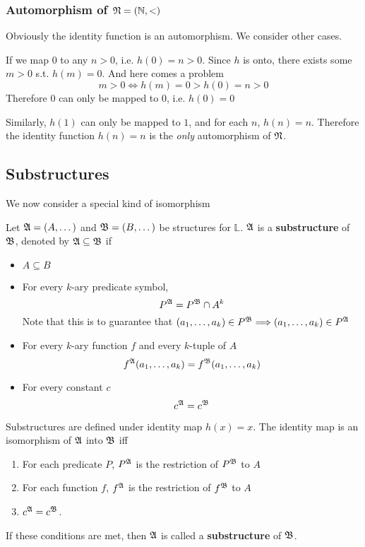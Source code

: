 \subsubsection{Automorphism of $\mathfrak{N} = (\mathbb{N}, <)$}

Obviously the identity function is an automorphism. We consider other cases.

If we map $0$ to any $n>0$, i.e. $h(0) = n > 0$. Since $h$ is onto, there exists some $m > 0$ s.t. $h(m) = 0$. And here comes a problem
\[ m > 0 \iff h(m) = 0 > h(0) = n > 0 \]
Therefore $0$ can only be mapped to $0$, i.e. $h(0) = 0$

Similarly, $h(1)$ can only be mapped to $1$, and for each $n$, $h(n) = n$. Therefore the identity function $h(n) = n$ is the \emph{only} automorphism of $\mathfrak{N}$.

\subsection{Substructures}

We now consider a special kind of isomorphism

\begin{definition}[Substructures]
    Let $\mathfrak{A} = (A,\dots)$ and $\mathfrak{B} = (B,\dots)$ be structures for $\mathbb{L}$. $\mathfrak{A}$ is a \textbf{substructure} of $\mathfrak{B}$, denoted by $\mathfrak{A} \subseteq \mathfrak{B}$ if
    \begin{itemize}
        \item $A \subseteq B$
        \item For every $k$-ary predicate symbol,
        \[ P^{\mathfrak{A}} = P^{\mathfrak{B}} \cap A^k \]
        Note that this is to guarantee that $(a_1,\dots,a_k)\in P^{\mathfrak{B}} \Longrightarrow (a_1,\dots,a_k)\in P^{\mathfrak{A}}$
        \item For every $k$-ary function $f$ and every $k$-tuple of $A$
        \[ f^{\mathfrak{A}}(a_1,\dots,a_k) = f^{\mathfrak{B}}(a_1,\dots,a_k) \]
        \item For every constant $c$
        \[ c^{\mathfrak{A}} = c^{\mathfrak{B}} \]
    \end{itemize}
\end{definition}
\begin{remark}
    Substructures are defined under identity map $h(x)=x$. The identity map is an isomorphism of $\mathfrak{A}$ into $\mathfrak{B}$ iff
    \begin{enumerate}
        \item For each predicate $P$, $P^{\mathfrak{A}}$ is the restriction of $P^{\mathfrak{B}}$ to $A$
        \item For each function $f$, $f^{\mathfrak{A}}$ is the restriction of $f^{\mathfrak{B}}$ to $A$
        \item $c^{\mathfrak{A}} = c^{\mathfrak{B}}$.
    \end{enumerate}
    If these conditions are met, then $\mathfrak{A}$ is called a \textbf{substructure} of $\mathfrak{B}$.
\end{remark}

